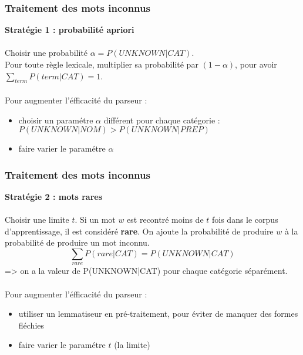 \documentclass{beamer}
\begin{document}
\begin{frame}
\frametitle{Traitement des mots inconnus}
\textbf{Strat\'egie 1 : probabilit\'e apriori} \\~\\

Choisir une probabilit\'e $\alpha = P(UNKNOWN|CAT)$. \\
Pour toute r\`egle lexicale, multiplier sa probabilit\'e par $(1 - \alpha)$,
pour avoir $\sum_{term} P(term|CAT) = 1$. \\~\\

Pour augmenter l'\'efficacit\'e du parseur :

\begin{itemize}
  \item choisir un param\'etre $\alpha$ diff\'erent pour chaque cat\'egorie :
  $P(UNKNOWN | NOM) > P(UNKNOWN | PREP)$
  \item faire varier le param\'etre $\alpha$
\end{itemize}
\end{frame}

\begin{frame}
\frametitle{Traitement des mots inconnus}
\textbf{Strat\'egie 2 : mots rares} \\~\\

Choisir une limite $t$. Si un mot $w$ est recontr\'e moins de $t$ fois dans le
corpus d'apprentissage, il est consid\'er\'e \textbf{rare}. On ajoute la
probabilit\'e de produire $w$ \`a la probabilit\'e de produire un mot inconnu. 
$$\sum_{rare} P(rare|CAT) = P(UNKNOWN|CAT)$$
=> on a la valeur de P(UNKNOWN|CAT) pour chaque cat\'egorie
s\'epar\'ement. \\~\\

Pour augmenter l'\'efficacit\'e du parseur :

\begin{itemize}
  \item utiliser un lemmatiseur en pr\'e-traitement, pour \'eviter de manquer
  des formes fl\'echies
  \item faire varier le param\'etre $t$ (la limite)
\end{itemize}
\end{frame}
\end{document}
